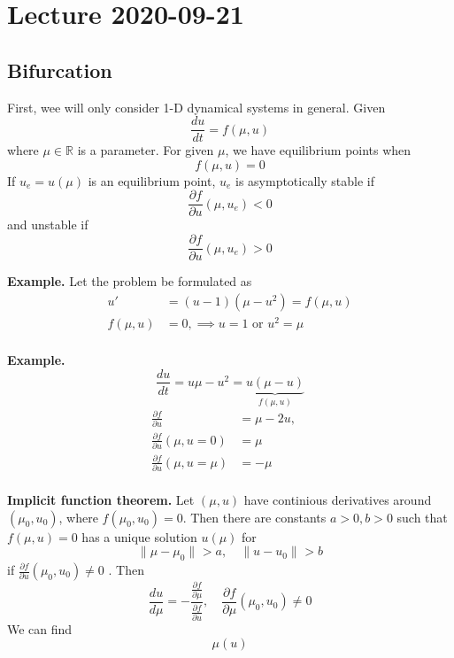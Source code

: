 \documentclass{article}
\theoremstyle{remark}
\begin{document}
 \newpage
 \section{Lecture 2020-09-21}%
 \label{sec:lecture_2020_09_21}
 

 \subsection{Bifurcation}%
 \label{sub:bifurcation}

 First, wee will only consider 1-D dynamical systems in general. Given \[
   \frac{d u}{dt  }  = f\left( \mu , u \right)
 \] 
 where $\mu  \in  \mathbb{R} $ is a parameter. For given $\mu $, we have equilibrium points when \[
 f\left( \mu ,u \right) = 0
 \] 
 If $u_{e} = u\left( \mu  \right)$ is an equilibrium  point, $u_{e}$ is asymptotically stable if \[
 \frac{\partial f}{\partial u}  \left( \mu ,u_{e} \right) < 0
 \]  
 and unstable if \[
 \frac{\partial f}{\partial u}  \left( \mu, u_{e}  \right) > 0
 \] 

 \textbf{Example.} 
 Let the problem be formulated as \[
 \begin{split}
   u'  &=  \left( u-1 \right)\left( \mu - u^2 \right) = f\left( \mu , u \right) \\
   f\left( \mu ,u \right) &=  0, \implies  u=1 \text{ or } u^2 = \mu  \\
 \end{split} 
 \] 

 \textbf{Example.}  \[
 \frac{d u}{d t}  = u \mu - u^2 = \underbrace{u\left( \mu  - u \right)}_{f\left( \mu ,u \right)} 
 \] 
 \[
 \begin{split}
   \frac{\partial f}{\partial u}  &=  \mu  -2u , \quad   \\
   \frac{\partial f}{\partial u} \left( \mu , u= 0 \right)  & = \mu \\
   \frac{\partial f}{\partial u} \left( \mu , u= \mu  \right) &=  -\mu  \\
 \end{split} 
 \] 

 \newpage

\begin{definition}
  \textbf{Implicit function theorem.} Let $\left( \mu ,u \right)$ have continious derivatives around $\left( \mu _{0}, u_{0} \right)$, where $f\left( \mu _{0}, u_{0} \right)= 0$.  Then there are constants $a>0, b> 0 $ such that $f\left( \mu ,u \right) = 0$ has a unique solution $u\left( \mu  \right)$ for \[
  \|\mu - \mu _{0}\|_{}^{} > a, \quad  \|u - u_{0}\|_{}^{} > b 
  \] 
  if $\displaystyle  \frac{\partial f}{\partial u} \left( \mu _{0}, u_{0} \right) \neq 0$ . Then   
  \[
  \frac{d u}{d \mu }  = - \frac{\frac{\partial f}{\partial \mu } }{\frac{\partial f}{\partial u} }  , \quad \frac{\partial f}{\partial \mu }  \left( \mu _{0}, u_{0} \right) \neq 0
  \] 
  We can find \[
  \mu \left( u \right)
  \] 
\end{definition}
 
\end{document}

